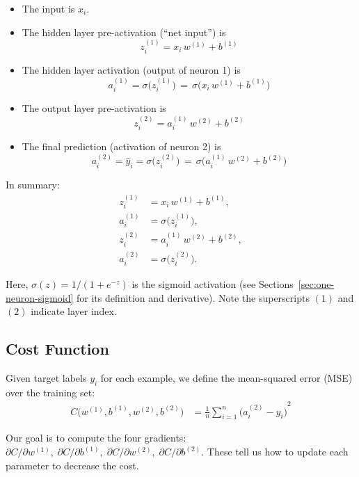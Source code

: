 \documentclass{article}
\begin{document}
\begin{itemize}
    \item The input is \(x_i\).
    \item The hidden layer pre-activation (``net input'') is 
    \[
        z_i^{(1)} = x_i\,w^{(1)} + b^{(1)}
    \]
    \item The hidden layer activation (output of neuron 1) is 
    \[
        a_i^{(1)} = \sigma\bigl(z_i^{(1)}\bigr) \,=\, \sigma\bigl(x_i\,w^{(1)} + b^{(1)}\bigr)
    \]
    \item The output layer pre-activation is 
    \[
        z_i^{(2)} = a_i^{(1)}\,w^{(2)} + b^{(2)}
    \]
    \item The final prediction (activation of neuron 2) is 
    \[
        a_i^{(2)} = \hat y_i = \sigma\bigl(z_i^{(2)}\bigr) \,=\, \sigma\bigl(a_i^{(1)}\,w^{(2)} + b^{(2)}\bigr)
    \]
\end{itemize}

\noindent In summary:
\begin{align}
    z_i^{(1)} &= x_i\,w^{(1)} + b^{(1)}, \\
    a_i^{(1)} &= \sigma\bigl(z_i^{(1)}\bigr), \\
    z_i^{(2)} &= a_i^{(1)}\,w^{(2)} + b^{(2)}, \\
    a_i^{(2)} &= \sigma\bigl(z_i^{(2)}\bigr).
\end{align}

\noindent Here, \(\sigma(z) = 1/(1 + e^{-z})\) is the sigmoid activation (see Sections~\ref{sec:one-neuron-sigmoid} for its definition and derivative).  Note the superscripts \((1)\) and \((2)\) indicate layer index.

\subsection{Cost Function}\label{sec:two-neuron-cost}

\noindent Given target labels \(y_i\) for each example, we define the mean-squared error (MSE) over the training set:
\begin{align}
    C\bigl(w^{(1)}, b^{(1)}, w^{(2)}, b^{(2)}\bigr)
    &= \frac{1}{n} \sum_{i=1}^{n} {\bigl(a_i^{(2)} - y_i\bigr)}^2
    \label{eq:two-cost}
\end{align}

\noindent Our goal is to compute the four gradients:
\(\partial C/\partial w^{(1)},\; \partial C/\partial b^{(1)},\; \partial C/\partial w^{(2)},\; \partial C/\partial b^{(2)}\).
These tell us how to update each parameter to decrease the cost.
\end{document}
